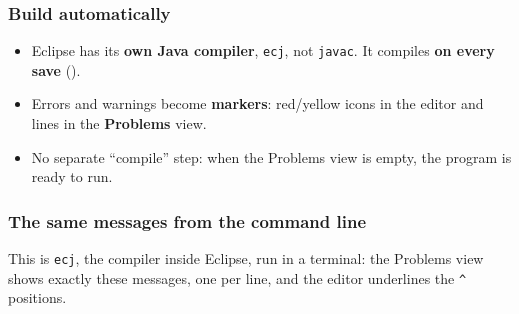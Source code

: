\documentclass[aspectratio=169,10pt,compress]{beamer}
\begin{document}
\begin{frame}[t,fragile] \frametitle{Build automatically}
  \begin{center}
  \end{center}
  \begin{itemize}\small
    \item Eclipse has its \textbf{own Java compiler}, \texttt{ecj}, not \texttt{javac}. It compiles \textbf{on every save}
          ().
    \item Errors and warnings become \textbf{markers}: red/yellow icons in the editor and lines in the \textbf{Problems} view.
    \item No separate ``compile'' step: when the Problems view is empty, the program is ready to run.
  \end{itemize}
\end{frame}




\begin{frame}[t,fragile] \frametitle{The same messages from the command line}

  \vspace{0.1em}
  \small
  This is \texttt{ecj}, the compiler inside Eclipse, run in a terminal: the Problems view shows exactly these messages,
  one per line, and the editor underlines the \texttt{\textasciicircum} positions.
\end{frame}
\end{document}
